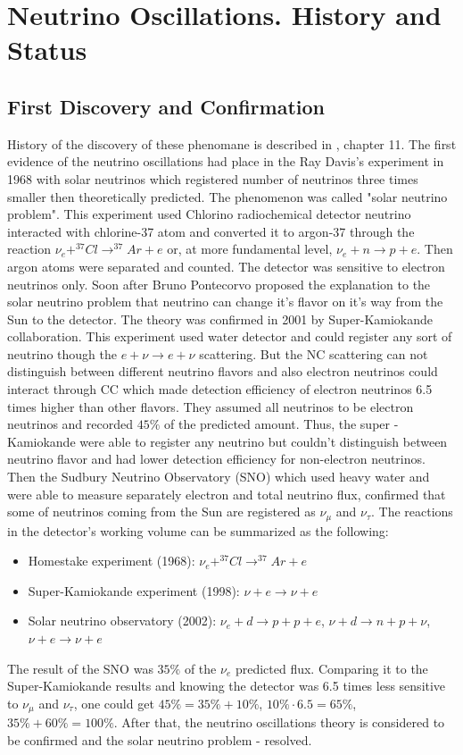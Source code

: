 \section{Neutrino Oscillations. History and Status}
\subsection{First Discovery and Confirmation}
History of the discovery of these phenomane is described in \cite{ref_Griffiths}, chapter 11. The first evidence of the neutrino oscillations had place in the Ray Davis's experiment in 1968 with solar neutrinos which registered number of neutrinos three times smaller then theoretically predicted. The phenomenon was called "solar neutrino problem". This experiment used Chlorino radiochemical detector neutrino interacted with chlorine-37 atom and converted it to argon-37 through the reaction $\nu_e+^{37}Cl \rightarrow ^{37}Ar+e$ or, at more fundamental level, $\nu_e+n \rightarrow p+e$. Then argon atoms were separated and counted. The detector was sensitive to electron neutrinos only. Soon after Bruno Pontecorvo proposed the explanation to the solar neutrino problem that neutrino can change it's flavor on it's way from the Sun to the detector. The theory was confirmed in 2001 by Super-Kamiokande collaboration. This experiment used water detector and could register any sort of neutrino though the $e+\nu \rightarrow e+\nu$ scattering. But the NC scattering can not distinguish between different neutrino flavors and also electron neutrinos could interact through CC which made detection efficiency of electron neutrinos 6.5 times higher than other flavors. They assumed all neutrinos to be electron neutrinos and recorded $45\%$ of the predicted amount. Thus, the super -Kamiokande were able to register any neutrino but couldn't distinguish between neutrino flavor and had lower detection efficiency for non-electron neutrinos. Then the Sudbury Neutrino Observatory (SNO) which used heavy water and were able to measure separately electron and total neutrino flux, confirmed that some of neutrinos coming from the Sun are registered as $\nu_\mu$ and $\nu_\tau$. The reactions in the detector's working volume can be summarized as the following:\\
\begin{itemize}
\item Homestake experiment (1968): $\nu_e + ^{37}Cl \rightarrow ^{37}Ar+e$
\item Super-Kamiokande experiment (1998): $\nu + e \rightarrow \nu + e$ 
\item Solar neutrino observatory (2002): $\nu_e + d \rightarrow p+p+e$, $\nu+d \rightarrow n+p+\nu$, $\nu+e \rightarrow \nu+e$
\end{itemize}
The result of the SNO was $35\%$ of the $\nu_e$ predicted flux. Comparing it to the Super-Kamiokande results and knowing the detector was 6.5 times less sensitive to $\nu_\mu$ and $\nu_\tau$, one could get $45\%=35\%+10\%$, $10\% \cdot 6.5 = 65\%$, $35\%+60\%=100\%$. After that, the neutrino oscillations theory is considered to be confirmed and the solar neutrino problem - resolved. 

